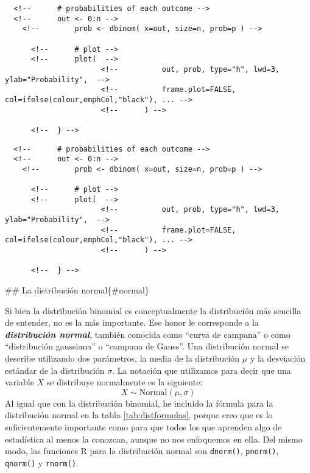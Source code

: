 \documentclass[spanish,]{book}
\begin{document}
\begin{verbatim}
  <!--      # probabilities of each outcome -->
  <!--      out <- 0:n -->
    <!--        prob <- dbinom( x=out, size=n, prob=p ) -->
      
      <!--      # plot -->
      <!--      plot(  -->
                      <!--          out, prob, type="h", lwd=3, ylab="Probability",  -->
                      <!--          frame.plot=FALSE, col=ifelse(colour,emphCol,"black"), ... -->
                      <!--      ) -->
      
      <!--  } -->
\end{verbatim}

\begin{verbatim}
  <!--      # probabilities of each outcome -->
  <!--      out <- 0:n -->
    <!--        prob <- dbinom( x=out, size=n, prob=p ) -->
      
      <!--      # plot -->
      <!--      plot(  -->
                      <!--          out, prob, type="h", lwd=3, ylab="Probability",  -->
                      <!--          frame.plot=FALSE, col=ifelse(colour,emphCol,"black"), ... -->
                      <!--      ) -->
      
      <!--  } -->
\end{verbatim}

\#\# La distribución normal\{\#normal\}

Si bien la distribución binomial es conceptualmente la distribución más
sencilla de entender, no es la más importante. Ese honor le corresponde
a la \textbf{\emph{distribución normal}}, también conocida como ``curva
de campana'' o como ``distribución gaussiana'' o ``campana de Gauss''.
Una distribución normal se describe utilizando dos parámetros, la media
de la distribución \(\mu\) y la desviación estándar de la distribución
\(\sigma\). La notación que utilizamos para decir que una variable \(X\)
se distribuye normalmente es la siguiente: \[
  X \sim \mbox{Normal}(\mu,\sigma)
\] Al igual que con la distribución binomial, he incluido la fórmula
para la distribución normal en la tabla \ref{tab:distformulas}, porque
creo que es lo suficientemente importante como para que todos los que
aprenden algo de estadística al menos la conozcan, aunque no nos
enfoquemos en ella. Del mismo modo, las funciones R para la distribución
normal son \texttt{dnorm()}, \texttt{pnorm()}, \texttt{qnorm()} y
\texttt{rnorm()}.
\end{document}

